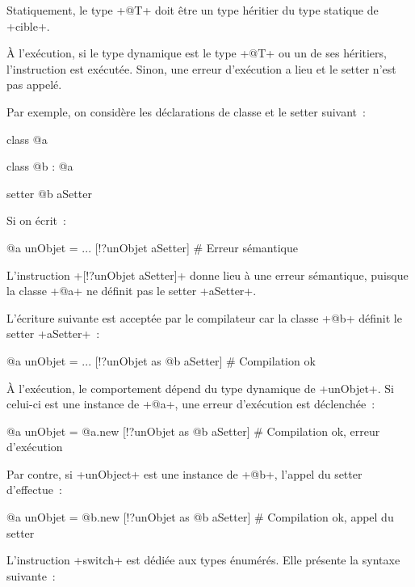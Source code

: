 Statiquement, le type \ggsq+@T+ doit être un type héritier du type statique de \ggsq+cible+.

À l'exécution, si le type dynamique est le type \ggsq+@T+ ou un de ses héritiers, l'instruction est exécutée. Sinon, une erreur d'exécution a lieu et le setter n'est pas appelé.

Par exemple, on considère les déclarations de classe et le setter suivant~:

\begin{galgas4}
class @a { }

class @b : @a { }

setter @b aSetter { }
\end{galgas4}

Si on écrit~:
\begin{galgas4}
@a unObjet = ...
[!?unObjet aSetter] # Erreur sémantique
\end{galgas4}

L'instruction \ggsq+[!?unObjet aSetter]+ donne lieu à une erreur sémantique, puisque la classe \ggsq+@a+ ne définit pas le setter \ggsq+aSetter+.

L'écriture suivante est acceptée par le compilateur car la classe \ggsq+@b+ définit le setter \ggsq+aSetter+~:
\begin{galgas4}
@a unObjet = ...
[!?unObjet as @b aSetter] # Compilation ok
\end{galgas4}

À l'exécution, le comportement dépend du type dynamique de \ggsq+unObjet+. Si celui-ci est une instance de \ggsq+@a+, une erreur d'exécution est déclenchée~:
\begin{galgas4}
@a unObjet = @a.new
[!?unObjet as @b aSetter] # Compilation ok, erreur d'exécution
\end{galgas4}


Par contre, si \ggsq+unObject+ est une instance de \ggsq+@b+, l'appel du setter d'effectue~:
\begin{galgas4}
@a unObjet = @b.new
[!?unObjet as @b aSetter] # Compilation ok, appel du setter
\end{galgas4}











L'instruction \ggsq+switch+ est dédiée aux types énumérés. Elle présente la syntaxe suivante~:

